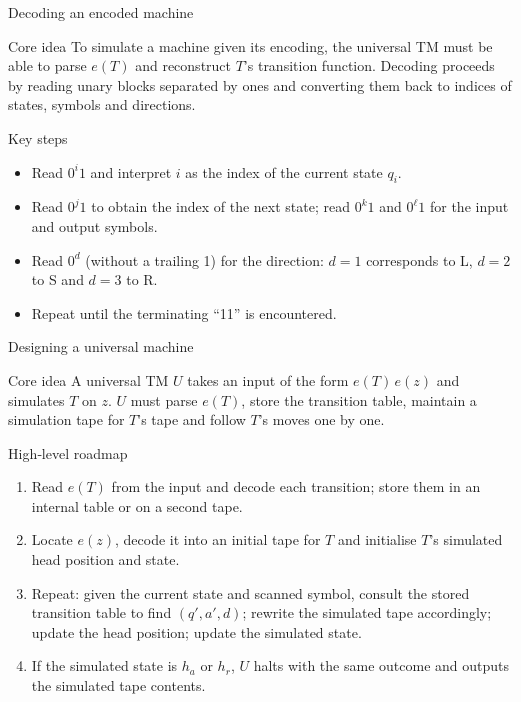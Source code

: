 \begin{frame}[t]{Decoding an encoded machine}
  \begin{tblock}{Core idea}
    To simulate a machine given its encoding, the universal TM must be
    able to parse $e(T)$ and reconstruct $T$’s transition function.
    Decoding proceeds by reading unary blocks separated by ones and
    converting them back to indices of states, symbols and directions.
  \end{tblock}
  \begin{tblock}{Key steps}
    \begin{itemize}
      \item Read $0^i 1$ and interpret $i$ as the index of the current
        state $q_i$.
      \item Read $0^j 1$ to obtain the index of the next state; read
        $0^k 1$ and $0^\ell 1$ for the input and output symbols.
      \item Read $0^d$ (without a trailing 1) for the direction:
        $d=1$ corresponds to L, $d=2$ to S and $d=3$ to R.
      \item Repeat until the terminating “11” is encountered.
    \end{itemize}
  \end{tblock}
  \label{fr:7.8-06}
\end{frame}

\begin{frame}[t]{Designing a universal machine}
  \begin{tblock}{Core idea}
    A universal TM $U$ takes an input of the form $e(T)\,e(z)$ and
    simulates $T$ on $z$.  $U$ must parse $e(T)$, store the transition
    table, maintain a simulation tape for $T$’s tape and follow $T$’s
    moves one by one.
  \end{tblock}
  \begin{tblock}{High‑level roadmap}
    \begin{enumerate}
      \item Read $e(T)$ from the input and decode each transition; store
        them in an internal table or on a second tape.
      \item Locate $e(z)$, decode it into an initial tape for $T$ and
        initialise $T$’s simulated head position and state.
      \item Repeat: given the current state and scanned symbol,
        consult the stored transition table to find $(q',a',d)$;
        rewrite the simulated tape accordingly; update the head
        position; update the simulated state.
      \item If the simulated state is $h_a$ or $h_r$, $U$ halts with
        the same outcome and outputs the simulated tape contents.
    \end{enumerate}
  \end{tblock}
  \label{fr:7.8-07}
\end{frame}

